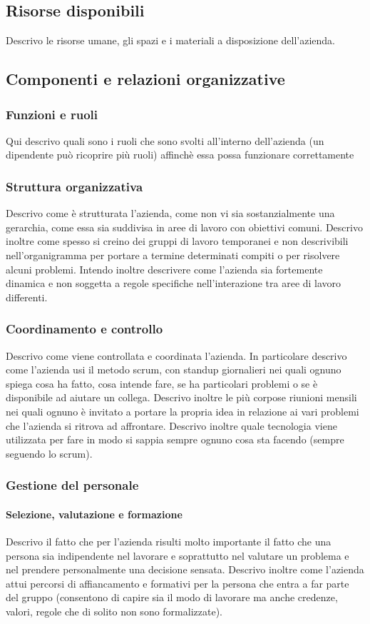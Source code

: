		\subsection{Risorse disponibili}
			Descrivo le risorse umane, gli spazi e i materiali a disposizione dell'azienda.
		\subsection{Componenti e relazioni organizzative}
			\subsubsection{Funzioni e ruoli}
				Qui descrivo quali sono i ruoli che sono svolti all'interno dell'azienda (un dipendente può ricoprire più ruoli)
				affinchè essa possa funzionare correttamente
			\subsubsection{Struttura organizzativa}
				Descrivo come è strutturata l'azienda, come non vi sia sostanzialmente una gerarchia, come essa sia suddivisa in
				aree di lavoro con obiettivi comuni. Descrivo inoltre come spesso si creino dei gruppi di lavoro temporanei e non
				descrivibili nell'organigramma per portare a termine determinati compiti o per risolvere alcuni problemi. Intendo
				inoltre descrivere come l'azienda sia fortemente dinamica e non soggetta a regole specifiche nell'interazione tra
				aree di lavoro differenti.
			\subsubsection{Coordinamento e controllo}
				Descrivo come viene controllata e coordinata l'azienda. In particolare descrivo come l'azienda usi il metodo scrum,
				con standup giornalieri nei quali ognuno spiega cosa ha fatto, cosa intende fare, se ha particolari problemi o se è
				disponibile ad aiutare un collega. Descrivo inoltre le più corpose riunioni mensili nei quali ognuno è invitato a
				portare la propria idea in relazione ai vari problemi che l'azienda si ritrova ad affrontare. Descrivo inoltre quale
				tecnologia viene utilizzata per fare in modo si sappia sempre ognuno cosa sta facendo (sempre seguendo lo scrum).
			\subsubsection{Gestione del personale}
				\paragraph{Selezione, valutazione e formazione}
					Descrivo il fatto che per l'azienda risulti molto importante il fatto che una persona sia indipendente nel
					lavorare e soprattutto nel valutare un problema e nel prendere personalmente una decisione sensata.
					Descrivo inoltre come l'azienda attui percorsi di affiancamento e formativi per la persona che entra a far
					parte del gruppo (consentono di capire sia il modo di lavorare ma anche credenze, valori, regole che di
					solito non sono formalizzate).
